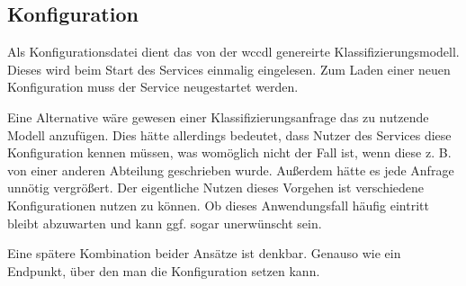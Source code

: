 \subsection{Konfiguration}
    Als Konfigurationsdatei dient das von der \gls{wccdl} genereirte Klassifizierungsmodell.
    Dieses wird beim Start des Services einmalig eingelesen.
    Zum Laden einer neuen Konfiguration muss der Service neugestartet werden.
    
    Eine Alternative wäre gewesen einer Klassifizierungsanfrage das zu nutzende Modell anzufügen.
    Dies hätte allerdings bedeutet, dass Nutzer des Services diese Konfiguration kennen müssen,
    was womöglich nicht der Fall ist, wenn diese z. B. von einer anderen Abteilung geschrieben wurde.
    Außerdem hätte es jede Anfrage unnötig vergrößert.
    Der eigentliche Nutzen dieses Vorgehen ist verschiedene Konfigurationen nutzen zu können.
    Ob dieses Anwendungsfall häufig eintritt bleibt abzuwarten und kann ggf. sogar unerwünscht sein.
    
    Eine spätere Kombination beider Ansätze ist denkbar.
    Genauso wie ein Endpunkt, über den man die Konfiguration setzen kann.